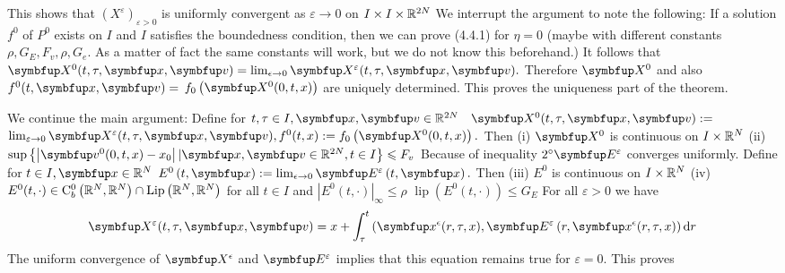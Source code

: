 \begin{lemma}
This shows that $\left(X^{\varepsilon}\right)_{\varepsilon>0}$ is uniformly convergent as $\varepsilon \rightarrow 0$ on $I \times I \times {\mathbb{R}}^{2 N}$ We interrupt the argument to note the following: If a solution $f^{0}$ of $P^{0}$ exists on $I$ and $I$ satisfies the boundedness condition, then we can prove (4.4.1) for $\eta=0$ (maybe with different constants $\rho, G_{E}, F_{v}, \rho, G_{e} .$ As a matter of fact the same constants will work, but we do not know this beforehand.) It follows that $\vect{X}^{0}(t, \tau, \vx, \vv)=\lim _{\epsilon \rightarrow 0} \vect{X}^{\varepsilon}(t, \tau, \vx, \vv) .$ Therefore $\vect{X}^{0}$ and also $f^{0}(t, \vx, \vv)=$
$f_{0}\left(\vect{X}^{0}(0, t, x)\right)$ are uniquely determined. This proves the uniqueness part of the theorem.

We continue the main argument: Define for $t, \tau \in I,\vx, \vv\in \bbR^{2 N} \quad \vect{X}^{0}(t, \tau, \vx, \vv):=$ $\lim _{\varepsilon \rightarrow 0} \vect{X}^{\varepsilon}(t, \tau, \vx, \vv), f^{0}(t, x):=f_{0}\left(\vect{X}^{0}(0, t, x)\right) .$ Then
(i) $\vect{X}^{0}$ is continuous on $I \times {\mathbb{R}}^{N}$
(ii) $\sup \left\{\left|\vv^{0}(0, t, x)-x_{0}\right| |\vx, \vv\in \bbR^{2 N}, t \in I\right\} \leqslant F_{v}$
Because of inequality $2^{\circ} \vE^{\varepsilon}$ converges uniformly. Define for $t \in I, \vx \in \bbR^{N}$ $E^{0}\left(t, \vx\right):=\lim _{\epsilon \rightarrow 0} \vE^{\varepsilon}\left(t, \vx\right) .$ Then
(iii) $E^{0}$ is continuous on $I \times {\mathbb{R}}^{N}$
(iv) $E^{0}(t, \cdot) \in \mathrm{C}_{b}^{0}\left({\mathbb{R}}^{N}, {\mathbb{R}}^{N}\right) \cap \operatorname{Lip}\left({\mathbb{R}}^{N}, {\mathbb{R}}^{N}\right)$ for all $t \in I$ and $\left|E^{0}(t, \cdot)\right|_{\infty} \leqslant \rho$
$\operatorname{lip}\left(E^{0}(t, \cdot)\right) \leqslant G_{E}$
For all $\varepsilon>0$ we have
\[
\vect{X}^{\varepsilon}(t, \tau, \vx, \vv)=x+\int_{\tau}^{t}\left(\vx^{\epsilon}(r, \tau, x), \vE^{\varepsilon}\left(r, \vx^{\epsilon}(r, \tau, x)\right) \mathrm{d} r\right.
\]
The uniform convergence of $\vect{X}^{\epsilon}$ and $\vE^{\varepsilon}$ implies that this equation remains true for $\varepsilon=0 .$ This proves



\end{lemma}
